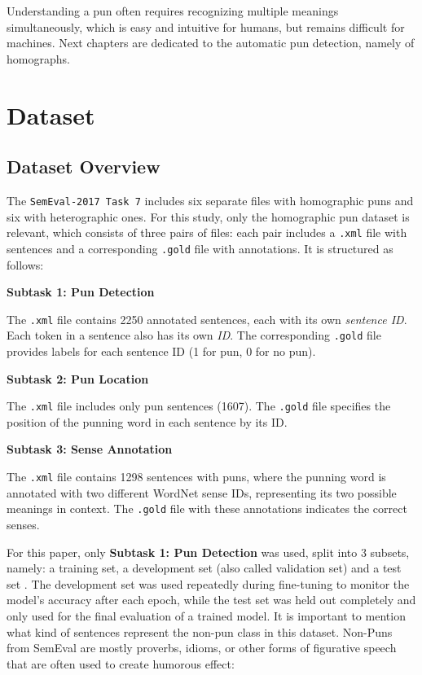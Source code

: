 \documentclass[11pt,a4paper]{article}
\begin{document}
\vspace{4pt}
Understanding a pun often requires recognizing multiple meanings simultaneously, which is easy and intuitive for humans, but remains difficult for machines. Next chapters are dedicated to the automatic pun detection, namely of homographs. 


\section{Dataset}\label{background}

\subsection{Dataset Overview}

The \texttt{SemEval-2017 Task 7} includes six separate files with homographic puns and six with heterographic ones. 
For this study, only the homographic pun dataset is relevant, which consists of three pairs of files: each pair includes a \texttt{.xml} file with sentences and a corresponding \texttt{.gold} file with annotations.
It is structured as follows:
\vspace{6pt}

\textbf{Subtask 1: Pun Detection}

The \texttt{.xml} file contains 2250 annotated sentences, each with its own \textit{sentence ID}.  
Each token in a sentence also has its own \textit{ID}.  
The corresponding \texttt{.gold} file provides labels for each sentence ID (1 for pun, 0 for no pun).
\vspace{6pt}

\textbf{Subtask 2: Pun Location}


The \texttt{.xml} file includes only pun sentences (1607).  
The \texttt{.gold} file specifies the position of the punning word in each sentence by its ID.
\vspace{6pt}

\textbf{Subtask 3: Sense Annotation}

The \texttt{.xml} file contains 1298 sentences with puns, where the punning word is annotated with two different WordNet sense IDs, representing its two possible meanings in context.
The \texttt{.gold} file with these annotations indicates the correct senses.

\vspace{4pt}
For this paper, only \textbf{Subtask 1: Pun Detection} was used, split into 3 subsets, namely: a training set, a development set (also called validation set) and a test set \citep{jurafsky2025slp}. The development set was used repeatedly during fine-tuning to monitor the model's accuracy after each epoch, while the test set was held out completely and only used for the final evaluation of a trained model.
It is important to mention what kind of sentences represent the non-pun class in this dataset. Non-Puns from SemEval are mostly proverbs, idioms, or other forms of figurative speech that are often used to create humorous effect:
\end{document}
